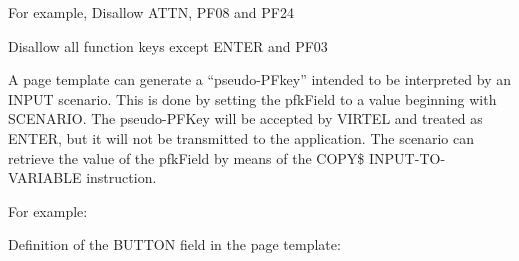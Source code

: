 \documentclass[letterpaper,10pt,english]{sphinxmanual}
\begin{document}
For example, Disallow ATTN, PF08 and PF24

\begin{sphinxVerbatim}[commandchars=\\\{\}]
   
\end{sphinxVerbatim}

Disallow all function keys except ENTER and PF03

\begin{sphinxVerbatim}[commandchars=\\\{\}]
   
\end{sphinxVerbatim}


A page template can generate a “pseudo-PFkey” intended to be interpreted by an INPUT scenario. This is done by
setting the pfkField to a value beginning with SCENARIO. The pseudo-PFKey will be accepted by VIRTEL and treated as
ENTER, but it will not be transmitted to the application. The scenario can retrieve the value of the pfkField by means of
the COPY\$ INPUT-TO-VARIABLE instruction.

For example:

Definition of the BUTTON field in the page template:

\begin{sphinxVerbatim}[commandchars=\\\{\}]
   
   
\end{sphinxVerbatim}
\end{document}
